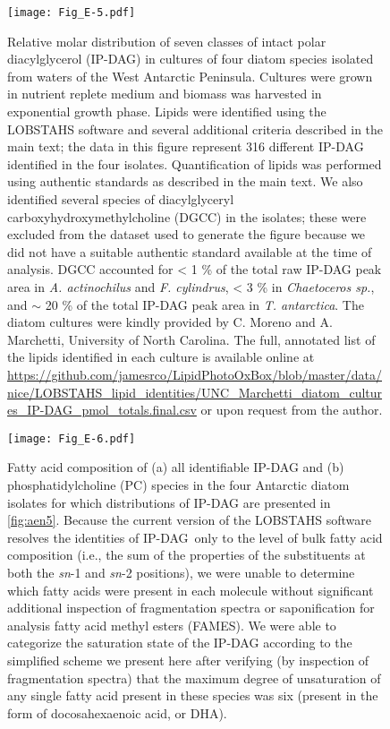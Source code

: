 \clearpage

\begin{figure}[!th]
\centering
\texttt{[image: Fig\_E-5.pdf]}
\caption[Relative molar distribution of seven classes of IP-DAG in cultures of four diatom species isolated from waters of the West Antarctic Peninsula]{Relative molar distribution of seven classes of intact polar diacylglycerol (IP-DAG) in cultures of four diatom species isolated from waters of the West Antarctic Peninsula. Cultures were grown in nutrient replete medium and biomass was harvested in exponential growth phase. Lipids were identified using the LOBSTAHS software and several additional criteria described in the main text; the data in this figure represent 316 different IP-DAG identified in the four isolates. Quantification of lipids was performed using authentic standards as described in the main text. We also identified several species of diacylglyceryl carboxyhydroxymethylcholine (DGCC) in the isolates; these were excluded from the dataset used to generate the figure because we did not have a suitable authentic standard available at the time of analysis. DGCC accounted for \textless{} 1 \% of the total raw IP-DAG peak area in \emph{A. actinochilus} and \emph{F. cylindrus}, \textless{} 3 \% in \emph{Chaetoceros sp.}, and $\sim$ 20 \% of the total IP-DAG peak area in \emph{T. antarctica}. The diatom cultures were kindly provided by C. Moreno and A. Marchetti, University of North Carolina. The full, annotated list of the lipids identified in each culture is available online at \url{https://github.com/jamesrco/LipidPhotoOxBox/blob/master/data/nice/LOBSTAHS_lipid_identities/UNC_Marchetti_diatom_cultures_IP-DAG_pmol_totals.final.csv} or upon request from the author.}
\label{fig:aen5}
\end{figure}

\clearpage

\begin{figure}[!th]
\centering
\texttt{[image: Fig\_E-6.pdf]}
\caption[Fatty acid composition of IP-DAG in the four Antarctic diatom isolates presented in \autoref{fig:aen5}]{Fatty acid composition of (a) all identifiable IP-DAG and (b) phosphatidylcholine (PC) species in the four Antarctic diatom isolates for which distributions of IP-DAG are presented in \autoref{fig:aen5}. Because the current version of the LOBSTAHS software resolves the identities of IP-DAG~only to the level of bulk fatty acid composition (i.e., the sum of the properties of the substituents at both the \emph{sn}-1 and \emph{sn}-2 positions), we were unable to determine which fatty acids were present in each molecule without significant additional inspection of fragmentation spectra or saponification for analysis fatty acid methyl esters (FAMES). We were able to categorize the saturation state of the IP-DAG according to the simplified scheme we present here after verifying (by inspection of fragmentation spectra) that the maximum degree of unsaturation of any single fatty acid present in these species was six (present in the form of docosahexaenoic acid, or DHA).}
\label{fig:aen6}
\end{figure}

